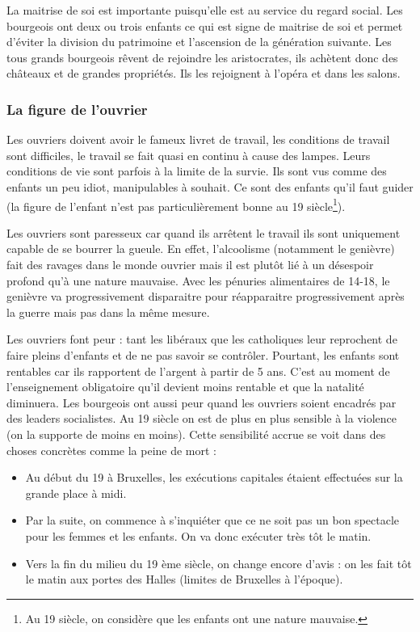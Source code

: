 \documentclass[12pt]{report}
\begin{document}
La maitrise de soi est importante puisqu’elle est au service du regard social. Les bourgeois ont
deux ou trois enfants ce qui est signe de maitrise de soi et permet d’éviter la division du
patrimoine et l’ascension de la génération suivante. Les tous grands bourgeois rêvent de
rejoindre les aristocrates, ils achètent donc des châteaux et de grandes propriétés. Ils les
rejoignent à l’opéra et dans les salons.

\subsubsection{La figure de l'ouvrier}

Les ouvriers doivent avoir le fameux livret de travail, les conditions de travail sont difficiles, le
travail se fait quasi en continu à cause des lampes. Leurs conditions de vie sont parfois à la
limite de la survie. Ils sont vus comme des enfants un peu idiot, manipulables à souhait. Ce
sont des enfants qu’il faut guider (la figure de l’enfant n’est pas particulièrement bonne au 19 
siècle\footnote{Au 19 siècle, on considère que les enfants ont une nature mauvaise.}).

Les ouvriers sont paresseux car quand ils arrêtent le travail ils sont uniquement capable de se
bourrer la gueule. En effet, l’alcoolisme (notamment le genièvre) fait des ravages dans le
monde ouvrier mais il est plutôt lié à un désespoir profond qu’à une nature mauvaise. Avec
les pénuries alimentaires de 14-18, le genièvre va progressivement disparaitre pour
réapparaitre progressivement après la guerre mais pas dans la même mesure.

Les ouvriers font peur : tant les libéraux que les catholiques leur reprochent de faire pleins
d’enfants et de ne pas savoir se contrôler. Pourtant, les enfants sont rentables car ils rapportent
de l’argent à partir de 5 ans. C’est au moment de l’enseignement obligatoire qu’il devient
moins rentable et que la natalité diminuera. Les bourgeois ont aussi peur quand les ouvriers
soient encadrés par des leaders socialistes.
Au 19 siècle on est de plus en plus sensible à la violence (on la supporte de moins en
moins). Cette sensibilité accrue se voit dans des choses concrètes comme la peine de mort :

\begin{itemize}
	\item Au début du 19 à Bruxelles, les exécutions capitales étaient effectuées sur la grande
place à midi.
\item Par la suite, on commence à s’inquiéter que ce ne soit pas un bon spectacle pour les
femmes et les enfants. On va donc exécuter très tôt le matin.
\item Vers la fin du milieu du 19 ème siècle, on change encore d’avis : on les fait tôt le matin
aux portes des Halles (limites de Bruxelles à l’époque).
\end{itemize}
\end{document}
